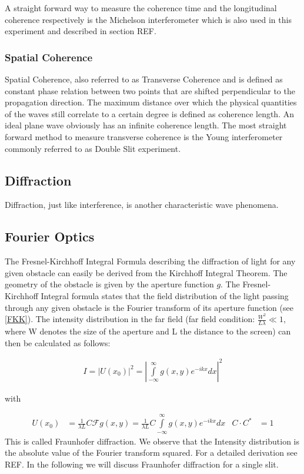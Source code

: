 A straight forward way to measure the coherence time and the longitudinal coherence respectively is the Michelson interferometer which is also used in this experiment and described in section REF.
\subsubsection{Spatial Coherence}
Spatial Coherence, also referred to as Transverse Coherence and is defined as constant phase relation between two points that are shifted perpendicular to the propagation direction. The maximum distance over which the physical quantities of the waves still correlate to a certain degree is defined as coherence length. An ideal plane wave obviously has an infinite coherence length. The most straight forward method to measure transverse coherence is the Young interferometer commonly referred to as Double Slit experiment.

\subsection{Diffraction}

Diffraction, just like interference, is another characteristic wave phenomena.

\subsection{Fourier Optics}

The Fresnel-Kirchhoff Integral Formula describing the diffraction of light for any given obstacle can easily be derived from the Kirchhoff Integral Theorem. The geometry of the obstacle is given by the aperture function $g$. The Fresnel-Kirchhoff Integral formula states that the field distribution of the light passing through any given obstacle is the Fourier transform of its aperture function (see \ref{FKK}). The intensity distribution in the far field (far field condition: $\frac{W^2}{L\lambda} \ll 1$, where W denotes the size of the aperture and L the distance to the screen) can then be calculated as follows:


\begin{align}
I=|U(x_0)|^2=\left| \int\limits_{-\infty}^{\infty} g(x,y)e^{-ikx}dx \right|^2
\end{align}

with 

\begin{align}
  U(x_0) &= \frac{1}{\lambda L} C \mathscr{F}{g(x, y)}    = \frac{1}{\lambda L} C   \int\limits_{-\infty}^{\infty}  g(x,y)e^{-ikx}dx    &  C  \cdot C^* &= 1                         \label{FKK}
\end{align}
This is called Fraunhofer diffraction. We observe that the Intensity distribution is the absolute value of the Fourier transform squared. For a detailed derivation see REF.
In the following we will discuss Fraunhofer diffraction for a single slit.

